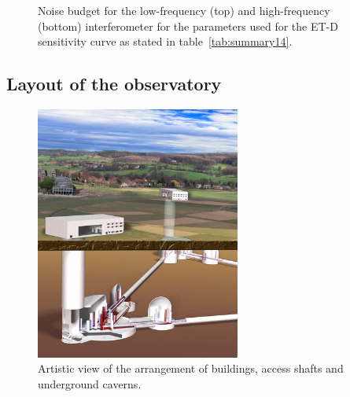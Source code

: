 \begin{figure}
\begin{center}
\begin{minipage}[b]{0.6\textwidth}
  \end{minipage}
 \caption{Noise budget for the low-frequency (top) and high-frequency (bottom) interferometer for the 
   parameters used for the ET-D sensitivity curve as stated in table~\ref{tab:summary14}.}
  \label{fig:noise_budget}
  \end{center}
\end{figure}

%
\FloatBarrier
\clearpage

\subsection{Layout of the observatory}

\begin{figure}
\centering
\vskip -0.35cm
\includegraphics[width=0.6\textwidth]{Intro/Intro_Figures/ArtisticViewBuildings.jpg}
\vskip 0.3cm
\caption{Artistic view of the arrangement of buildings, access shafts and underground caverns.}
\vskip -0.1cm
\label{Fig:Buildings}
\end{figure} 


